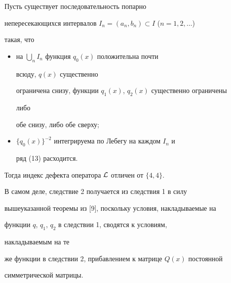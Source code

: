 \begin{cor} 


Пусть существует последовательность попарно 


непересекающихся интервалов $I_n=(a_n,b_n)\subset I$ ($n=1,2,\dotsc$) 


такая, что 


\begin{itemize} 


\item[1)] на $\bigcup\limits_n I_n$ функция $q_0(x)$ положительна почти 


всюду, $q(x)$ существенно 


ограничена снизу, функции $q_1(x)$, $q_2(x)$ существенно ограничены 


либо 


обе снизу, либо обе сверху; 


\item[2)] $\{q_0(x)\}^{-2}$ интегрируема по Лебегу на каждом $I_n$ и 


ряд (13) расходится. 


\end{itemize} 


Тогда индекс дефекта оператора $\cal L$ отличен от $\{4,4\}$. 


\end{cor} 


 


В самом деле, следствие 2 получается из следствия 1 в силу 


вышеуказанной теоремы из [9], поскольку условия, накладываемые на 


функции $q$, $q_1$, $q_2$ в следствии 1, сводятся к условиям, 


накладываемым на те 


же функции в следствии 2, прибавлением к матрице $Q(x)$ постоянной 


симметрической матрицы. 


 


